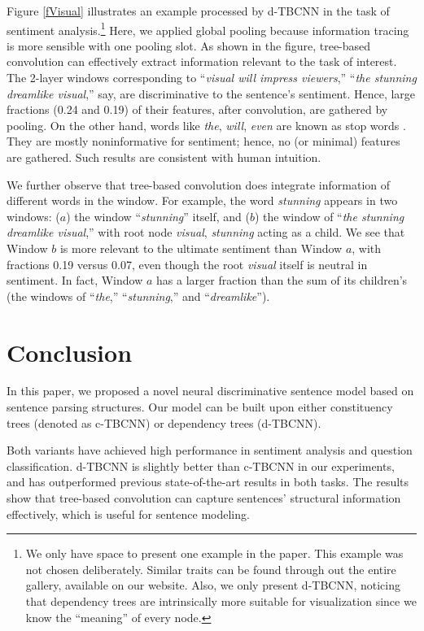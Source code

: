 \documentclass[11pt,a4paper]{article}
\begin{document}
Figure \ref{fVisual} illustrates an example processed by d-TBCNN in the task
of sentiment analysis.\footnote{
We only have space to present one example in the paper.
This example was not chosen deliberately. Similar traits can be found
through out the entire gallery, available on our website.
Also, we only present d-TBCNN, noticing that dependency trees are intrinsically more suitable for visualization
since we know the ``meaning'' of every node.}
Here, we applied global pooling
because information tracing is more sensible with one pooling slot.
As shown in the figure, tree-based convolution can effectively extract
information relevant to the task of interest.
The 2-layer windows corresponding to
``\textit{visual will impress viewers},'' ``\textit{the stunning dreamlike visual},'' say,
are discriminative to the sentence's sentiment. Hence, large
fractions (0.24 and 0.19) of their
features, after convolution, are gathered by pooling.
On the other hand,
words like \textit{the}, \textit{will}, \textit{even} are known as stop words \cite{stopwords}.
They are mostly noninformative for sentiment; hence, no (or minimal)
features are gathered. Such results are
consistent with human intuition.

We further observe that tree-based convolution does integrate information
of different words in the window.
For example, the word \textit{stunning} appears in two windows:
($a$) the window ``\textit{stunning}'' itself,
and ($b$) the window of ``\textit{the stunning dreamlike visual},'' with root node  \textit{visual},
\textit{stunning} acting as a child.
We see that Window $b$ is more relevant to the ultimate sentiment than Window $a$,
with fractions 0.19 versus 0.07,
even though the root \textit{visual} itself is neutral in sentiment.
In fact, Window $a$ has a larger fraction than the sum of its children's (the windows of ``\textit{the},'' ``\textit{stunning},'' and ``\textit{dreamlike}'').

\vspace{-.1cm}

\section{Conclusion}

\vspace{-.1cm}

In this paper, we proposed a novel neural
discriminative sentence model based on sentence parsing structures.
Our model can be built upon either constituency trees (denoted as c-TBCNN) or dependency trees (d-TBCNN).

Both variants have achieved high performance
in sentiment analysis and
question classification.
d-TBCNN is slightly better than c-TBCNN in our experiments, and 
has outperformed previous state-of-the-art results in both tasks. 
The results show that tree-based convolution
can capture sentences' structural information effectively, which
is useful for sentence modeling.





\end{document}
